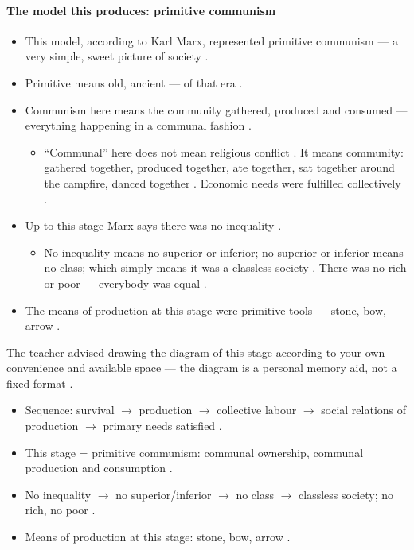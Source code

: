 \paragraph{The model this produces: primitive communism}
\begin{itemize}
    \item This model, according to Karl Marx, represented primitive communism --- a very simple, sweet picture of society .
    \item Primitive means old, ancient --- of that era .
    \item Communism here means the community gathered, produced and consumed --- everything happening in a communal fashion .
    \begin{itemize}
        \item ``Communal'' here does not mean religious conflict . It means community: gathered together, produced together, ate together, sat together around the campfire, danced together . Economic needs were fulfilled collectively .
    \end{itemize}
    \item Up to this stage Marx says there was no inequality .
    \begin{itemize}
        \item No inequality means no superior or inferior; no superior or inferior means no class; which simply means it was a classless society . There was no rich or poor --- everybody was equal .
    \end{itemize}
    \item The means of production at this stage were primitive tools --- stone, bow, arrow .
\end{itemize}

\begin{ExampleBox}
The teacher advised drawing the diagram of this stage according to your own convenience and available space --- the diagram is a personal memory aid, not a fixed format .
\end{ExampleBox}

\begin{QuickRevision}
\begin{itemize}
    \item Sequence: survival $\rightarrow$ production $\rightarrow$ collective labour $\rightarrow$ social relations of production $\rightarrow$ primary needs satisfied .
    \item This stage = primitive communism: communal ownership, communal production and consumption .
    \item No inequality $\rightarrow$ no superior/inferior $\rightarrow$ no class $\rightarrow$ classless society; no rich, no poor .
    \item Means of production at this stage: stone, bow, arrow .
\end{itemize}
\end{QuickRevision}

